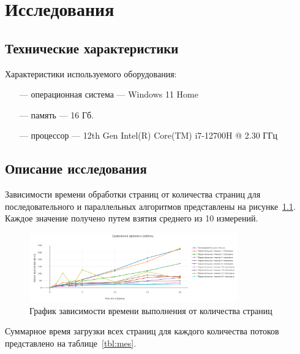 \chapter{Исследования}

\section{Технические характеристики}
Характеристики используемого оборудования:
\begin{itemize}
    \item[---] операционная система --- Windows 11 Home~\cite{windows}
    \item[---] память --- 16 Гб.
    \item[---] процессор --- 12th Gen Intel(R) Core(TM) i7-12700H @  2.30 ГГц~\cite{intel}
\end{itemize}

\section{Описание исследования}

Зависимости времени обработки страниц от количества страниц для последовательного и параллельных алгоритмов представлены на рисунке~\ref{fig:plot}. Каждое значение получено путем взятия среднего из 10 измерений.

\begin{figure}[h]
	\centering
	\includegraphics[width=0.8\textwidth]{images/plot.png}
	\caption{График зависимости времени выполнения от количества страниц}
	\label{fig:plot}
\end{figure}

\clearpage

Суммарное время загрузки всех страниц для каждого количества потоков представлено на таблице~\ref{tbl:mes}.

